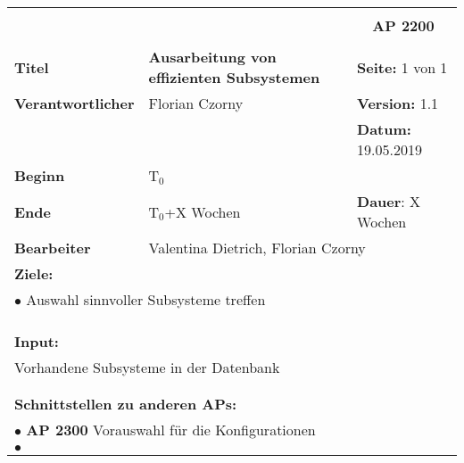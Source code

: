 \clearpage
\begin{table}[!h]
 \begin{center}
  \begin{tabular}{|p{35mm}||p{55mm}|p{50mm}||p{40mm}|}
   \hline
   \multicolumn{3}{|l||}{\textbf{}} & \multicolumn{1}{c|}{}\\
   \multicolumn{3}{|l||}{\textbf{}} & \multicolumn{1}{c|}{\textbf{AP 2200}}\\
   \multicolumn{3}{|l||}{\textbf{}} & \multicolumn{1}{c|}{}\\
   \hline\hline
   \textbf{Titel} & \multicolumn{2}{p{7cm}||}{\textbf{Ausarbeitung von effizienten Subsystemen}} & \textbf{Seite:} 1 von 1\\
   \hline
   \textbf{Verantwortlicher} & \multicolumn{2}{l||}{Florian Czorny} & \textbf{Version:} 1.1\\
   \hline
   \multicolumn{3}{|l||}{} & \textbf{Datum:} 19.05.2019\\
   \hline\hline
   \textbf{Beginn} & \multicolumn{2}{l||}{T$_0$} & \\
   \hline
   \textbf{Ende} & \multicolumn{2}{l||}{T$_0$+X Wochen} & \textbf{Dauer}: X Wochen\\
   \hline\hline
   \textbf{Bearbeiter} & \multicolumn{3}{l|}{Valentina Dietrich, Florian Czorny}\\
   \hline\hline
   \multicolumn{4}{|p{150mm}|}{\textbf{Ziele:}}\\
   \multicolumn{4}{|p{150mm}|}{$\bullet$ Auswahl sinnvoller Subsysteme treffen}\\
   \multicolumn{4}{|p{150mm}|}{}\\
   \multicolumn{4}{|p{150mm}|}{}\\
   \multicolumn{4}{|p{150mm}|}{}\\
   \multicolumn{4}{|p{150mm}|}{\textbf{Input:}}\\
   \multicolumn{4}{|p{150mm}|}{Vorhandene Subsysteme in der Datenbank}\\
   \multicolumn{4}{|p{150mm}|}{}\\
   \multicolumn{4}{|p{150mm}|}{}\\
   \multicolumn{4}{|p{150mm}|}{\textbf{Schnittstellen zu anderen APs:}}\\
   \multicolumn{4}{|p{150mm}|}{$\bullet$ \textbf{AP 2300} Vorauswahl für die Konfigurationen}\\
   \multicolumn{4}{|p{150mm}|}{$\bullet$ \textbf{} }\\

\end{tabular}
\end{center}
\end{table}
